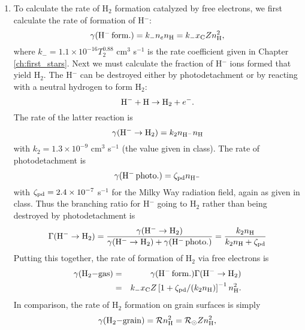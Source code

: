 \begin{enumerate}
\begin{enumerate}
\item To calculate the rate of H$_2$ formation catalyzed by free electrons, we first calculate the rate of formation of H$^-$:
\begin{displaymath}
\gamma({\rm H}^{-}\,{\rm form.}) = k_{-} n_e n_{\rm H} = k_{-} x_{\rm C} Z n_{\rm H}^2,
\end{displaymath}
where $k_{-} = 1.1\times 10^{-16} T_2^{0.88}$ cm$^3$ s$^{-1}$ is the rate coefficient given in Chapter \ref{ch:first_stars}. Next we must calculate the fraction of H$^-$ ions formed that yield H$_2$. The H$^-$ can be destroyed either by photodetachment or by reacting with a neutral hydrogen to form H$_2$:
\begin{displaymath}
{\rm H}^{-} + {\rm H} \rightarrow {\rm H}_2 + e^{-}.
\end{displaymath}
The rate of the latter reaction is
\begin{displaymath}
\gamma({\rm H}^{-}\rightarrow{\rm H}_2) = k_2 n_{{\rm H}^-} n_{\rm H}
\end{displaymath}
with $k_2 = 1.3\times 10^{-9}$ cm$^3$ s$^{-1}$ (the value given in class). The rate of photodetachment is
\begin{displaymath}
\gamma({\rm H}^{-}\,{\rm photo.}) = \zeta_{\rm pd} n_{{\rm H}^-}
\end{displaymath}
with $\zeta_{\rm pd} = 2.4\times 10^{-7}$ s$^{-1}$ for the Milky Way radiation field, again as given in class. Thus the branching ratio for H$^{-}$ going to H$_2$ rather than being destroyed by photodetachment is
\begin{displaymath}
\Gamma({\rm H}^{-}\rightarrow{\rm H}_2) = \frac{\gamma({\rm H}^{-}\rightarrow{\rm H}_2)}{\gamma({\rm H}^{-}\rightarrow{\rm H}_2) + \gamma({\rm H}^{-}\,{\rm photo.})} = \frac{k_2 n_{\rm H}}{k_2 n_{\rm H}+\zeta_{\rm pd}}
\end{displaymath}
Putting this together, the rate of formation of H$_2$ via free electrons is
\begin{eqnarray*}
\gamma({\rm H}_2{\rm - gas}) & = & \gamma({\rm H}^{-}\,{\rm form.}) \Gamma({\rm H}^{-}\rightarrow{\rm H}_2) \\
& = & k_{-} x_{\rm C} Z  \left[1+ \zeta_{\rm pd}/(k_2 n_{\rm H})\right]^{-1} n_{\rm H}^2. 
\end{eqnarray*}
In comparison, the rate of H$_2$ formation on grain surfaces is simply
\begin{displaymath}
\gamma({\rm H}_2{\rm - grain}) = \mathcal{R} n_{\rm H}^2 = \mathcal{R}_{\odot} Z n_{\rm H}^2,
\end{displaymath}

\end{enumerate}
\end{enumerate}
